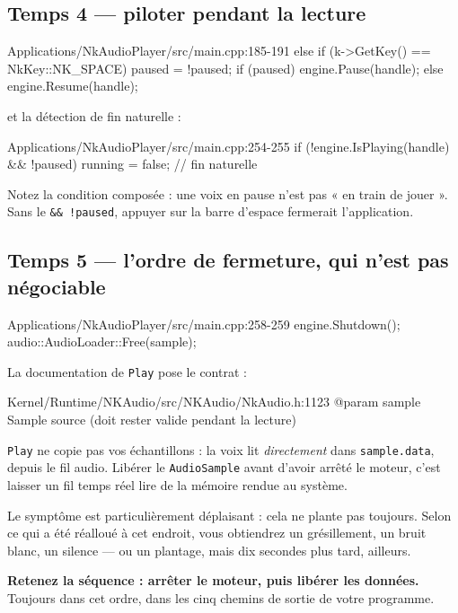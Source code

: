 \subsection{Temps 4 — piloter pendant la lecture}

\begin{nkcode}{Applications/NkAudioPlayer/src/main.cpp:185-191}
                else if (k->GetKey() == NkKey::NK_SPACE) {
                    paused = !paused;
                    if (paused)
                        engine.Pause(handle);
                    else
                        engine.Resume(handle);
                }
\end{nkcode}

et la détection de fin naturelle :

\begin{nkcode}{Applications/NkAudioPlayer/src/main.cpp:254-255}
        if (!engine.IsPlaying(handle) && !paused)
            running = false; // fin naturelle
\end{nkcode}

Notez la condition composée : une voix en pause n'est pas « en train de jouer ».
Sans le \texttt{\&\& !paused}, appuyer sur la barre d'espace fermerait
l'application.

\subsection{Temps 5 — l'ordre de fermeture, qui n'est pas négociable}

\begin{nkcode}{Applications/NkAudioPlayer/src/main.cpp:258-259}
    engine.Shutdown();
    audio::AudioLoader::Free(sample);
\end{nkcode}

\begin{nkpiege}
La documentation de \texttt{Play} pose le contrat :

\begin{nkcode}{Kernel/Runtime/NKAudio/src/NKAudio/NkAudio.h:1123}
 @param sample  Sample source (doit rester valide pendant la lecture)
\end{nkcode}

\texttt{Play} ne copie pas vos échantillons : la voix lit \emph{directement} dans
\texttt{sample.data}, depuis le fil audio. Libérer le \texttt{AudioSample} avant
d'avoir arrêté le moteur, c'est laisser un fil temps réel lire de la mémoire
rendue au système.

Le symptôme est particulièrement déplaisant : cela ne plante pas toujours. Selon
ce qui a été réalloué à cet endroit, vous obtiendrez un grésillement, un bruit
blanc, un silence — ou un plantage, mais dix secondes plus tard, ailleurs.

\textbf{Retenez la séquence : arrêter le moteur, puis libérer les données.}
Toujours dans cet ordre, dans les cinq chemins de sortie de votre programme.
\end{nkpiege}

